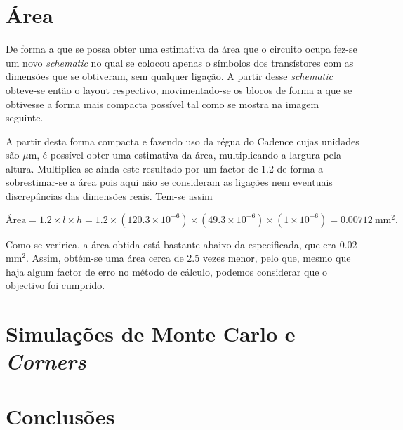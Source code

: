 \documentclass[11pt]{article}
\numberwithin{equation}{section}
\begin{document}
\pagebreak

\section{Área}

De forma a que se possa obter uma estimativa da área que o circuito ocupa fez-se um novo \textit{schematic} no qual se colocou apenas o símbolos dos transístores com as dimensões que se obtiveram, sem qualquer ligação. A partir desse \textit{schematic} obteve-se então o layout respectivo, movimentado-se os blocos de forma a que se obtivesse a forma mais compacta possível tal como se mostra na imagem seguinte.


A partir desta forma compacta e fazendo uso da régua do Cadence cujas unidades são $\mu$m, é possível obter uma estimativa da área, multiplicando a largura pela altura. Multiplica-se ainda este resultado por um factor de 1.2 de forma a sobrestimar-se a área pois aqui não se consideram as ligações nem eventuais discrepâncias das dimensões reais. Tem-se assim

\vspace{-7mm}
\begin{equation}
\text{Área} = 1.2\times l\times h = 1.2\times\left(120.3 \times 10^{-6}\right) \times \left(49.3 \times 10^{-6}\right) \times \left(1 \times 10^{-6}\right) = 0.00712~\text{mm}^2.
\end{equation}

\vspace{-1mm}
Como se veririca, a área obtida está bastante abaixo da especificada, que era 0.02 $\text{mm}^2$. Assim, obtém-se uma área cerca de 2.5 vezes menor, pelo que, mesmo que haja algum factor de erro no método de cálculo, podemos considerar que o objectivo foi cumprido.

\pagebreak

\section{Simulações de Monte Carlo e \textit{Corners}}


\pagebreak

\section{Conclusões}


\pagebreak

\listoftodos[Notes]
\end{document}
